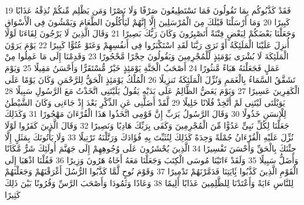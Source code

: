 \documentclass[20pt,a4paper]{article}
\begin{document}
{\tiny\colorbox{cl_aya}{19}} فَقَدْ كَذَّبُوكُم بِمَا تَقُولُونَ فَمَا تَسْتَطِيعُونَ صَرْفًا وَلَا نَصْرًا وَمَن يَظْلِم مِّنكُمْ نُذِقْهُ عَذَابًا كَبِيرًا
{\tiny\colorbox{cl_aya}{20}} وَمَا أَرْسَلْنَا قَبْلَكَ مِنَ الْمُرْسَلِينَ إِلَّا إِنَّهُمْ لَيَأْكُلُونَ الطَّعَامَ وَيَمْشُونَ فِى الْأَسْوَاقِ وَجَعَلْنَا بَعْضَكُمْ لِبَعْضٍ فِتْنَةً أَتَصْبِرُونَ وَكَانَ رَبُّكَ بَصِيرًا
{\tiny\colorbox{cl_aya}{21}} وَقَالَ الَّذِينَ لَا يَرْجُونَ لِقَاءَنَا لَوْلَا أُنزِلَ عَلَيْنَا الْمَلَئِكَةُ أَوْ نَرَى رَبَّنَا لَقَدِ اسْتَكْبَرُوا فِى أَنفُسِهِمْ وَعَتَوْ عُتُوًّا كَبِيرًا
{\tiny\colorbox{cl_aya}{22}} يَوْمَ يَرَوْنَ الْمَلَئِكَةَ لَا بُشْرَى يَوْمَئِذٍ لِّلْمُجْرِمِينَ وَيَقُولُونَ حِجْرًا مَّحْجُورًا
{\tiny\colorbox{cl_aya}{23}} وَقَدِمْنَا إِلَى مَا عَمِلُوا مِنْ عَمَلٍ فَجَعَلْنَهُ هَبَاءً مَّنثُورًا
{\tiny\colorbox{cl_aya}{24}} أَصْحَبُ الْجَنَّةِ يَوْمَئِذٍ خَيْرٌ مُّسْتَقَرًّا وَأَحْسَنُ مَقِيلًا
{\tiny\colorbox{cl_aya}{25}} وَيَوْمَ تَشَقَّقُ السَّمَاءُ بِالْغَمَمِ وَنُزِّلَ الْمَلَئِكَةُ تَنزِيلًا
{\tiny\colorbox{cl_aya}{26}} الْمُلْكُ يَوْمَئِذٍ الْحَقُّ لِلرَّحْمَنِ وَكَانَ يَوْمًا عَلَى الْكَفِرِينَ عَسِيرًا
{\tiny\colorbox{cl_aya}{27}} وَيَوْمَ يَعَضُّ الظَّالِمُ عَلَى يَدَيْهِ يَقُولُ يَلَيْتَنِى اتَّخَذْتُ مَعَ الرَّسُولِ سَبِيلًا
{\tiny\colorbox{cl_aya}{28}} يَوَيْلَتَى لَيْتَنِى لَمْ أَتَّخِذْ فُلَانًا خَلِيلًا
{\tiny\colorbox{cl_aya}{29}} لَّقَدْ أَضَلَّنِى عَنِ الذِّكْرِ بَعْدَ إِذْ جَاءَنِى وَكَانَ الشَّيْطَنُ لِلْإِنسَنِ خَذُولًا
{\tiny\colorbox{cl_aya}{30}} وَقَالَ الرَّسُولُ يَرَبِّ إِنَّ قَوْمِى اتَّخَذُوا هَذَا الْقُرْءَانَ مَهْجُورًا
{\tiny\colorbox{cl_aya}{31}} وَكَذَلِكَ جَعَلْنَا لِكُلِّ نَبِىٍّ عَدُوًّا مِّنَ الْمُجْرِمِينَ وَكَفَى بِرَبِّكَ هَادِيًا وَنَصِيرًا
{\tiny\colorbox{cl_aya}{32}} وَقَالَ الَّذِينَ كَفَرُوا لَوْلَا نُزِّلَ عَلَيْهِ الْقُرْءَانُ جُمْلَةً وَحِدَةً كَذَلِكَ لِنُثَبِّتَ بِهِ فُؤَادَكَ وَرَتَّلْنَهُ تَرْتِيلًا
{\tiny\colorbox{cl_aya}{33}} وَلَا يَأْتُونَكَ بِمَثَلٍ إِلَّا جِئْنَكَ بِالْحَقِّ وَأَحْسَنَ تَفْسِيرًا
{\tiny\colorbox{cl_aya}{34}} الَّذِينَ يُحْشَرُونَ عَلَى وُجُوهِهِمْ إِلَى جَهَنَّمَ أُولَئِكَ شَرٌّ مَّكَانًا وَأَضَلُّ سَبِيلًا
{\tiny\colorbox{cl_aya}{35}} وَلَقَدْ ءَاتَيْنَا مُوسَى الْكِتَبَ وَجَعَلْنَا مَعَهُ أَخَاهُ هَرُونَ وَزِيرًا
{\tiny\colorbox{cl_aya}{36}} فَقُلْنَا اذْهَبَا إِلَى الْقَوْمِ الَّذِينَ كَذَّبُوا بَِٔايَتِنَا فَدَمَّرْنَهُمْ تَدْمِيرًا
{\tiny\colorbox{cl_aya}{37}} وَقَوْمَ نُوحٍ لَّمَّا كَذَّبُوا الرُّسُلَ أَغْرَقْنَهُمْ وَجَعَلْنَهُمْ لِلنَّاسِ ءَايَةً وَأَعْتَدْنَا لِلظَّلِمِينَ عَذَابًا أَلِيمًا
{\tiny\colorbox{cl_aya}{38}} وَعَادًا وَثَمُودَا وَأَصْحَبَ الرَّسِّ وَقُرُونًا بَيْنَ ذَلِكَ كَثِيرًا
\end{document}
